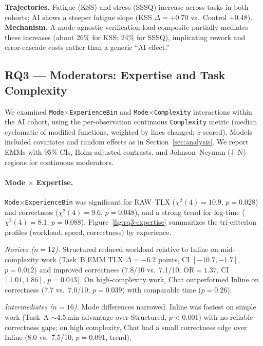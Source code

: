 \documentclass[sigconf]{acmart}
\begin{document}
\textbf{Trajectories.} Fatigue (KSS) and stress (SSSQ) increase across tasks in both cohorts; AI shows a steeper fatigue slope (KSS \(\Delta{=}{+}0.70\) vs.\ Control \(+\)0.48). \textbf{Mechanism.} A mode-agnostic verification-load composite partially mediates these increases (about 26\% for KSS; 24\% for SSSQ), implicating rework and error-cascade costs rather than a generic ``AI effect.''



\subsection{RQ3 — Moderators: Expertise and Task Complexity}
\label{sec:rq3}
We examined \texttt{Mode$\times$ExperienceBin} and \texttt{Mode$\times$Complexity} interactions within the AI cohort, using the per-observation continuous \texttt{Complexity} metric (median cyclomatic of modified functions, weighted by lines changed; $z$-scored). Models included covariates and random effects as in Section~\ref{sec:analysis}. We report EMMs with 95\% CIs, Holm-adjusted contrasts, and Johnson--Neyman (J--N) regions for continuous moderators.

\paragraph{Mode $\times$ Expertise.}
\texttt{Mode$\times$ExperienceBin} was significant for RAW--TLX ($\chi^2(4){=}10.9$, $p{=}0.028$) and correctness ($\chi^2(4){=}9.6$, $p{=}0.048$), and a strong trend for log-time ($\chi^2(4){=}8.1$, $p{=}0.088$). Figure~\ref{fig:rq3-expertise} summarizes the tri‑criterion profiles (workload, speed, correctness) by experience.


\emph{Novices ($n{=}12$).} Structured reduced workload relative to Inline on mid-complexity work (Task~B EMM TLX $\Delta{=}{-}6.2$ points, CI $[{-}10.7, {-}1.7]$, $p{=}0.012$) and improved correctness (7.8/10 vs.\ 7.1/10; OR$=1.37$, CI $[1.01, 1.86]$, $p{=}0.043$). On high-complexity work, Chat outperformed Inline on correctness (7.7 vs.\ 7.0/10; $p{=}0.039$) with comparable time ($p{=}0.26$).

\emph{Intermediates ($n{=}16$).} Mode differences narrowed. Inline was fastest on simple work (Task~A $\sim$4.5\,min advantage over Structured, $p<0.001$) with no reliable correctness gaps; on high complexity, Chat had a small correctness edge over Inline (8.0 vs.\ 7.5/10; $p{=}0.091$, trend).
\end{document}
